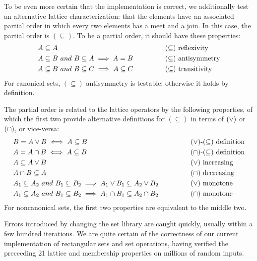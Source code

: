 To be even more certain that the implementation is correct, we additionally test an alternative lattice characterization: that the elements have an associated partial order in which every two elements has a meet and a join.
In this case, the partial order is $(\subseteq)$.
To be a partial order, it should have these properties:
\begin{equation}
\begin{aligned}
	&A \subseteq A
	&&\text{$(\subseteq)$ reflexivity} \\
	&A \subseteq B~and~B \subseteq A \implies A = B
	&&\text{$(\subseteq)$ antisymmetry} \\
	&A \subseteq B~and~B \subseteq C \implies A \subseteq C
	\hspace{0.5in} &&\text{$(\subseteq)$ transitivity}
\end{aligned}
\end{equation}
For canonical sets, $(\subseteq)$ antisymmetry is testable; otherwise it holds by definition.

The partial order is related to the lattice operators by the following properties, of which the first two provide alternative definitions for $(\subseteq)$ in terms of $(\vee)$ or $(\cap)$, or vice-versa:
\begin{equation}
\begin{aligned}
	&B = A \vee B \iff A \subseteq B
	&&\text{$(\vee)$-$(\subseteq)$ definition} \\
	&A = A \cap B \iff A \subseteq B
	&&\text{$(\cap)$-$(\subseteq)$ definition} \\
	&A \subseteq A \vee B
	&&\text{$(\vee)$ increasing} \\
	&A \cap B \subseteq A
	&&\text{$(\cap)$ decreasing} \\
	&A_1 \subseteq A_2~and~B_1 \subseteq B_2 \implies A_1 \vee B_1 \subseteq A_2 \vee B_2
	&&\text{$(\vee)$ monotone} \\
	&A_1 \subseteq A_2~and~B_1 \subseteq B_2 \implies A_1 \cap B_1 \subseteq A_2 \cap B_2
	\hspace{0.5in} &&\text{$(\cap)$ monotone} \\
\end{aligned}
\end{equation}
For noncanonical sets, the first two properties are equivalent to the middle two.

Errors introduced by changing the set library are caught quickly, usually within a few hundred iterations.
We are quite certain of the correctness of our current implementation of rectangular sets and set operations, having verified the preceeding 21 lattice and membership properties on millions of random inputs.


